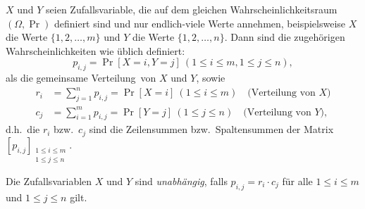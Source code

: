 
$X$ und $Y$ seien Zufallsvariable, die auf dem gleichen Wahrscheinlichkeitsraum
$(\Omega, \Pr)$ definiert sind und nur endlich-viele Werte annehmen,
beispielsweise $X$ die Werte $\{1,2,\dots,m\}$ und $Y$ die Werte
$\{1,2,\dots,n\}$. Dann sind die zugehörigen Wahrscheinlichkeiten wie üblich
definiert:
\[
  p_{i,j} = \Pr[X=i,Y=j]\ (1\leq i\leq m, 1\leq j\leq n),
\]
als die \glqq gemeinsame Verteilung\grqq\ von $X$ und $Y$, sowie
\begin{align*}
	r_i &= \sum_{j=1}^n p_{i,j} = \Pr[X=i]\ (1 \leq i \leq m)\quad \text{(Verteilung von $X$)}\\
	c_j &= \sum_{i=1}^m p_{i,j} = \Pr[Y=j]\ (1 \leq j \leq n)\quad \text{(Verteilung von $Y$)},
\end{align*}
d.h.\ die $r_i$ bzw.\ $c_j$ sind die Zeilensummen bzw.\ Spaltensummen der
Matrix $[p_{i,j}]_{\substack{1\leq i\leq m\\ 1\leq j\leq n}}$.

Die Zufallsvariablen $X$ und $Y$ sind \emph{unabhängig}, falls $p_{i,j} = r_i
\cdot c_j$ für alle $1\leq i\leq m$ und $1\leq j\leq n$ gilt.

